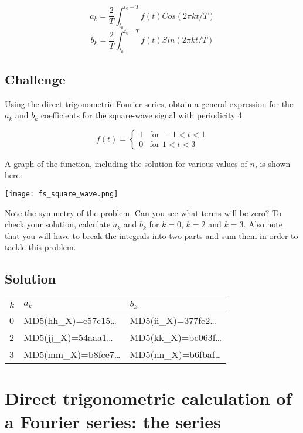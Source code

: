\begin{equation}
    a_k = \frac{2}{T} \int_{t_0}^{t_0+T} f(t) Cos(2 \pi k t/T)
\end{equation}
\begin{equation}
    b_k = \frac{2}{T} \int_{t_0}^{t_0+T} f(t) Sin(2 \pi k t/T)
\end{equation}

\subsection*{Challenge}
Using the direct trigonometric Fourier series, obtain a general expression for the $a_k$ and $b_k$ coefficients for the square-wave signal with periodicity 4

\begin{equation}
    f(t)=
    \begin{cases}
        1 & \text{for } -1<t<1 \\
        0 & \text{for } 1<t<3
    \end{cases}
\end{equation}

A graph of the function, including the solution for various values of $n$, is shown here:

\texttt{[image: fs\_square\_wave.png]}

Note the symmetry of the problem. Can you see what terms will be zero? To check your solution, calculate $a_k$ and $b_k$ for $k=0$, $k=2$ and $k=3$. Also note that you will have to break the integrals into two parts and sum them in order to tackle this problem.

\subsection*{Solution}
\begin{tabular}{|l|l|l|}
    \hline
    $k$ & $a_k$ & $b_k$ \\
    \hline
    0 & MD5(hh\_X)=e57c15\ldots & MD5(ii\_X)=377fe2\ldots \\
    2 & MD5(jj\_X)=54aaa1\ldots & MD5(kk\_X)=be063f\ldots \\
    3 & MD5(mm\_X)=b8fce7\ldots & MD5(nn\_X)=b6fbaf\ldots \\
    \hline
\end{tabular}

\timebox




\newpage
\section{Direct trigonometric calculation of a Fourier series: the series}

